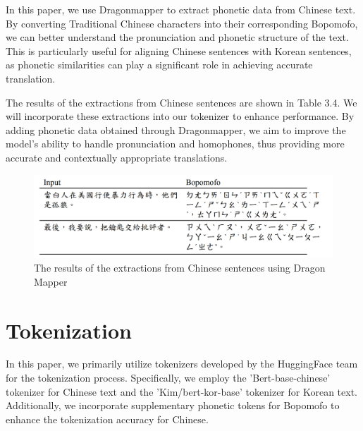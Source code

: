 \documentclass[PhD]{PHlab-thesis}
\begin{document}
In this paper, we use Dragonmapper to extract phonetic data from Chinese text. By converting Traditional Chinese characters into their corresponding Bopomofo, we can better understand the pronunciation and phonetic structure of the text. This is particularly useful for aligning Chinese sentences with Korean sentences, as phonetic similarities can play a significant role in achieving accurate translation.

The results of the extractions from Chinese sentences are shown in Table 3.4. We will incorporate these extractions into our tokenizer to enhance performance. By adding phonetic data obtained through Dragonmapper, we aim to improve the model's ability to handle pronunciation and homophones, thus providing more accurate and contextually appropriate translations.

\begin{figure}[h!]
  \centering
  \includegraphics[width=\linewidth]{tab_3_4.jpg}
  \captionsetup{type=table}
  \caption{The results of the extractions from Chinese sentences using Dragon Mapper}
  \label{tab:dragonmapper}
\end{figure}


\section{Tokenization}
In this paper, we primarily utilize tokenizers developed by the HuggingFace team for the tokenization process. Specifically, we employ the 'Bert-base-chinese' tokenizer for Chinese text and the 'Kim/bert-kor-base' tokenizer for Korean text. Additionally, we incorporate supplementary phonetic tokens for Bopomofo to enhance the tokenization accuracy for Chinese.
\end{document}
